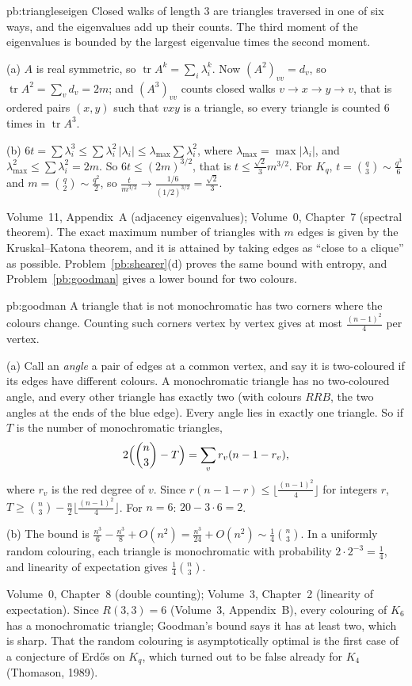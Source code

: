 \begin{solution}{pb:triangleseigen}
\idea Closed walks of length $3$ are triangles traversed in one of six ways, and the eigenvalues add up their counts. The third
moment of the eigenvalues is bounded by the largest eigenvalue times the second moment.

\writeup (a) $A$ is real symmetric, so $\operatorname{tr}A^k=\sum_i\lambda_i^k$. Now $(A^2)_{vv}=d_v$, so $\operatorname{tr}A^2=\sum_vd_v=2m$; and $(A^3)_{vv}$ counts closed
walks $v\to x\to y\to v$, that is ordered pairs $(x,y)$ such that $vxy$ is a triangle, so every triangle is counted $6$ times in
$\operatorname{tr}A^3$.

(b) $6t=\sum\lambda_i^3\le\sum\lambda_i^2\,|\lambda_i|\le\lambda_{\max}\sum\lambda_i^2$, where $\lambda_{\max}=\max|\lambda_i|$, and
$\lambda_{\max}^2\le\sum\lambda_i^2=2m$. So $6t\le(2m)^{3/2}$, that is $t\le\frac{\sqrt2}3m^{3/2}$. For $K_q$, $t=\binom q3\sim\frac{q^3}6$ and
$m=\binom q2\sim\frac{q^2}2$, so $\frac t{m^{3/2}}\to\frac{1/6}{(1/2)^{3/2}}=\frac{\sqrt2}3$.

\tools Volume~11, Appendix~A (adjacency eigenvalues); Volume~0, Chapter~7 (spectral theorem).
\leads The exact maximum number of triangles with $m$ edges is given by the Kruskal--Katona theorem, and it is attained by
taking edges as ``close to a clique'' as possible. Problem~\ref{pb:shearer}(d) proves the same bound with entropy, and
Problem~\ref{pb:goodman} gives a lower bound for two colours.
\end{solution}

\begin{solution}{pb:goodman}
\idea A triangle that is not monochromatic has two corners where the colours change. Counting such corners vertex by vertex
gives at most $\frac{(n-1)^2}4$ per vertex.

\writeup (a) Call an \emph{angle} a pair of edges at a common vertex, and say it is two-coloured if its edges have different colours. A
monochromatic triangle has no two-coloured angle, and every other triangle has exactly two (with colours $RRB$, the two angles at
the ends of the blue edge). Every angle lies in exactly one triangle. So if $T$ is the number of monochromatic triangles,
\[
2\Bigl(\binom n3-T\Bigr)=\sum_vr_v(n-1-r_v),
\]
where $r_v$ is the red degree of $v$. Since $r(n-1-r)\le\lfloor\frac{(n-1)^2}4\rfloor$ for integers $r$, $T\ge\binom n3-\frac n2\lfloor\frac{(n-1)^2}4\rfloor$.
For $n=6$: $20-3\cdot6=2$.

(b) The bound is $\frac{n^3}6-\frac{n^3}8+O(n^2)=\frac{n^3}{24}+O(n^2)\sim\frac14\binom n3$. In a uniformly random colouring, each triangle is
monochromatic with probability $2\cdot2^{-3}=\frac14$, and linearity of expectation gives $\frac14\binom n3$.

\tools Volume~0, Chapter~8 (double counting); Volume~3, Chapter~2 (linearity of expectation).
\leads Since $R(3,3)=6$ (Volume~3, Appendix~B), every colouring of $K_6$ has a monochromatic triangle; Goodman's bound says
it has at least two, which is sharp. That the random colouring is asymptotically optimal is the first case of a
conjecture of Erdős on $K_q$, which turned out to be false already for $K_4$ (Thomason, 1989).
\end{solution}

